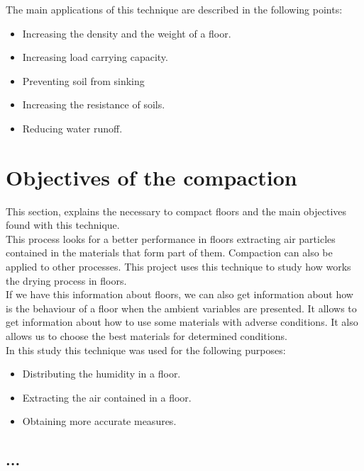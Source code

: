The main applications of this technique are described in the following points:

\begin{itemize}

\item Increasing the density and the weight of a floor.

\item Increasing load carrying capacity.

\item Preventing soil from sinking

\item Increasing the resistance of soils.

\item Reducing water runoff.

\end{itemize}

\section{Objectives of the compaction}

This section, explains the necessary to compact floors and the main objectives found with this technique.\\

This process looks for a better performance in floors extracting air particles contained in the materials that form part of them. Compaction can also be applied to other processes. This project uses this technique to study how works the drying process in floors.\\

If we have this information about floors, we can also get information about how is the behaviour of a floor when the ambient variables are presented. It allows to get information about how to use some materials with adverse conditions. It also allows us to choose the best materials for determined conditions.\\

In this study this technique was used for the following purposes:

\begin{itemize}

\item Distributing the humidity in a floor.

\item Extracting the air contained in a floor.

\item Obtaining more accurate measures.

\end{itemize}

\subsection{...}

\newpage
\newpage